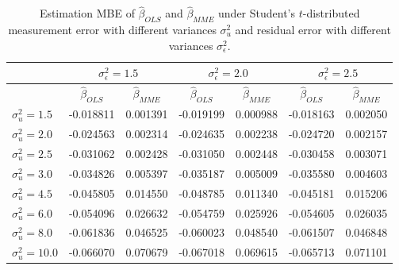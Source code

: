 \documentclass{article}
\begin{document}
\begin{table}[ht]
    \centering
    \caption{Estimation MBE of $\hat{\beta}_{OLS}$ and $\hat{\beta}_{MME}$ under Student's $t$-distributed measurement error with different variances $\sigma^2_u$ and residual error with different variances $\sigma^2_\epsilon$.}
    \label{Tab:MBE_t}
    \begin{tabular}[t]{lcccccc}
        \hline
        &\multicolumn{2}{c}{$\sigma^2_\epsilon=1.5$}&\multicolumn{2}{c}{$\sigma^2_\epsilon=2.0$}&\multicolumn{2}{c}{$\sigma^2_\epsilon=2.5$}\\
        \hline
        &$\hat{\beta}_{OLS}$&$\hat{\beta}_{MME}$&$\hat{\beta}_{OLS}$&$\hat{\beta}_{MME}$&$\hat{\beta}_{OLS}$&$\hat{\beta}_{MME}$\\
        \hline
        $\sigma^2_u = 1.5$&-0.018811&0.001391&-0.019199&0.000988&-0.018163&0.002050\\
        $\sigma^2_u = 2.0$&-0.024563&0.002314&-0.024635&0.002238&-0.024720&0.002157\\
        $\sigma^2_u = 2.5$&-0.031062&0.002428&-0.031050&0.002448&-0.030458&0.003071\\
        $\sigma^2_u = 3.0$&-0.034826&0.005397&-0.035187&0.005009&-0.035580&0.004603\\
        $\sigma^2_u = 4.5$&-0.045805&0.014550&-0.048785&0.011340&-0.045181&0.015206\\
        $\sigma^2_u = 6.0$&-0.054096&0.026632&-0.054759&0.025926&-0.054605&0.026035\\
        $\sigma^2_u = 8.0$&-0.061836&0.046525&-0.060023&0.048540&-0.061507&0.046848\\
        $\sigma^2_u = 10.0$&-0.066070&0.070679&-0.067018&0.069615&-0.065713&0.071101\\
        \hline
    \end{tabular}
\end{table}
\end{document}
